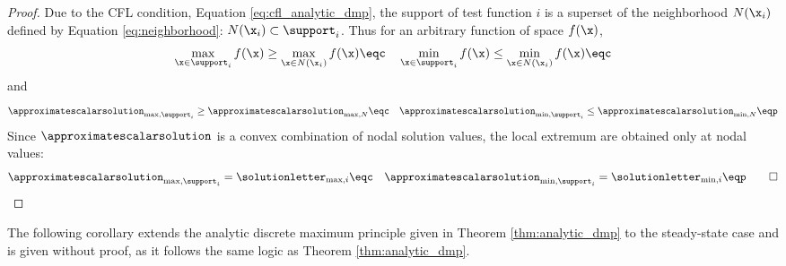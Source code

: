 \begin{proof}
Due to the CFL condition, Equation \eqref{eq:cfl_analytic_dmp}, the support of
test function $i$ is a superset of the neighborhood $N(\x_i)$ defined by
Equation \eqref{eq:neighborhood}: $N(\x_i)\subset\support_i$. Thus
for an arbitrary function of space $f(\x)$,
\[
  \max\limits_{\x\in\support_i}f(\x)
    \geq \max\limits_{\x\in N(\x_i)}f(\x) \eqc \quad
  \min\limits_{\x\in\support_i}f(\x)
    \leq \min\limits_{\x\in N(\x_i)}f(\x) \eqc
\]
and
\[
  \approximatescalarsolution_{\max,\support_i}
    \geq \approximatescalarsolution_{\max,N} \eqc \quad
  \approximatescalarsolution_{\min,\support_i}
    \leq \approximatescalarsolution_{\min,N} \eqp
\]
Since $\approximatescalarsolution$ is a convex combination of nodal solution
values, the local extremum are obtained only at nodal values:
\[
  \approximatescalarsolution_{\max,\support_i}
    = \solutionletter_{\max,i} \eqc \quad
  \approximatescalarsolution_{\min,\support_i}
    = \solutionletter_{\min,i} \eqp \qed
\]
\end{proof}

The following corollary extends the analytic discrete maximum principle given
in Theorem \ref{thm:analytic_dmp} to the steady-state case and is given
without proof, as it follows the same logic as Theorem \ref{thm:analytic_dmp}.

